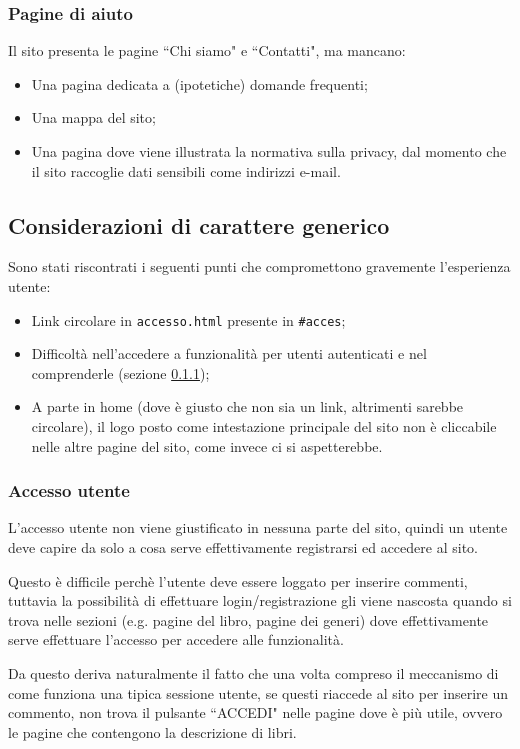 \subsubsection{Pagine di aiuto}
Il sito presenta le pagine ``Chi siamo" e ``Contatti", ma mancano:
\begin{itemize}
\item Una pagina dedicata a (ipotetiche) domande frequenti;
\item Una mappa del sito;
\item Una pagina dove viene illustrata la normativa sulla privacy, dal momento
che il sito raccoglie dati sensibili come indirizzi e-mail.
\end{itemize}

\subsection{Considerazioni di carattere generico}
Sono stati riscontrati i seguenti punti che compromettono gravemente
l'esperienza utente:
\begin{itemize}
\item Link circolare in \texttt{accesso.html} presente in \texttt{\#acces};
\item Difficoltà nell'accedere a funzionalità per utenti autenticati e nel
comprenderle (sezione \ref{sec:user-login});
\item A parte in home (dove è giusto che non sia un link, altrimenti sarebbe
circolare), il logo posto come intestazione principale del sito non è
cliccabile nelle altre pagine del sito, come invece ci si aspetterebbe.
\end{itemize}

\subsubsection{Accesso utente}\label{sec:user-login}
L'accesso utente non viene giustificato in nessuna parte del sito, quindi un
utente deve capire da solo a cosa serve effettivamente registrarsi ed accedere
al sito.

Questo è difficile perchè l'utente deve essere loggato per inserire commenti,
tuttavia la possibilità di effettuare login/registrazione gli viene nascosta
quando si trova nelle sezioni (e.g. pagine del libro, pagine dei generi) dove
effettivamente serve effettuare l'accesso per accedere alle funzionalità.

Da questo deriva naturalmente il fatto che una volta compreso il meccanismo di
come funziona una tipica sessione utente, se questi riaccede al sito per
inserire un commento, non trova il pulsante ``ACCEDI" nelle pagine dove è più
utile, ovvero le pagine che contengono la descrizione di libri.
